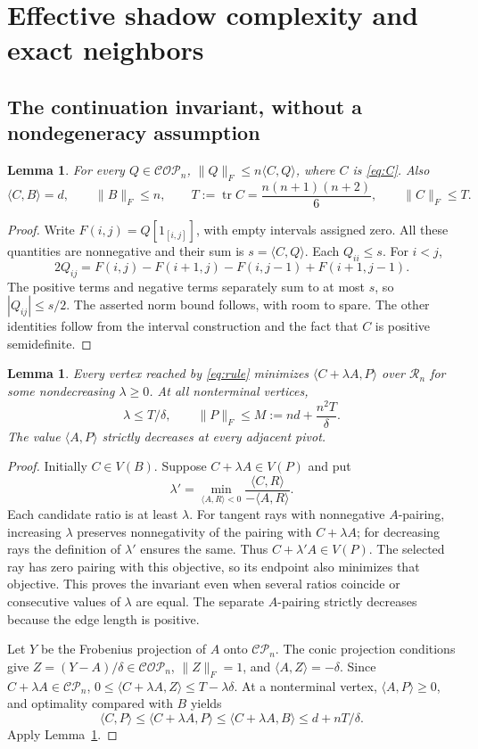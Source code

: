 \documentclass[11pt]{article}
\newtheorem{lemma}[theorem]{Lemma}
\theoremstyle{remark}\newtheorem{remark}[theorem]{Remark}
\newcommand{\CP}{\mathcal{CP}}
\newcommand{\COP}{\mathcal{COP}}
\newcommand{\Ry}{\mathcal R}
\newcommand{\tr}{\operatorname{tr}}
\newcommand{\ip}[2]{\langle #1,#2\rangle}
\newcommand{\norm}[1]{\lVert#1\rVert}
\begin{document}
\section{Effective shadow complexity and exact neighbors}\label{sec:shadow}
\subsection{The continuation invariant, without a nondegeneracy assumption}
\begin{lemma}\label{lem:anchor}
For every $Q\in\COP_n$, $\norm Q_F\le n\ip CQ$, where $C$ is \eqref{eq:C}. Also
\[
 \ip CB=d,\qquad \norm B_F\le n,\qquad
 T:=\tr C=\frac{n(n+1)(n+2)}6,\qquad \norm C_F\le T.
\]
\end{lemma}
\begin{proof}
Write $F(i,j)=Q[1_{[i,j]}]$, with empty intervals assigned zero. All these quantities are nonnegative and their sum is $s=\ip CQ$. Each $Q_{ii}\le s$. For $i<j$,
\[
 2Q_{ij}=F(i,j)-F(i+1,j)-F(i,j-1)+F(i+1,j-1).
\]
The positive terms and negative terms separately sum to at most $s$, so $|Q_{ij}|\le s/2$. The asserted norm bound follows, with room to spare. The other identities follow from the interval construction and the fact that $C$ is positive semidefinite.
\end{proof}

\begin{lemma}\label{lem:shadow}
Every vertex reached by \eqref{eq:rule} minimizes $\ip{C+\lambda A}{P}$ over $\Ry_n$ for some nondecreasing $\lambda\ge0$. At all nonterminal vertices,
\begin{equation}\label{eq:M}
 \lambda\le T/\delta,
 \qquad \norm P_F\le M:=nd+\frac{n^2T}{\delta}.
\end{equation}
The value $\ip AP$ strictly decreases at every adjacent pivot.
\end{lemma}
\begin{proof}
Initially $C\in V(B)$. Suppose $C+\lambda A\in V(P)$ and put
\[
 \lambda'=\min_{\ip AR<0}\frac{\ip CR}{-\ip AR}.
\]
Each candidate ratio is at least $\lambda$. For tangent rays with nonnegative $A$-pairing, increasing $\lambda$ preserves nonnegativity of the pairing with $C+\lambda A$; for decreasing rays the definition of $\lambda'$ ensures the same. Thus $C+\lambda'A\in V(P)$. The selected ray has zero pairing with this objective, so its endpoint also minimizes that objective. This proves the invariant even when several ratios coincide or consecutive values of $\lambda$ are equal. The separate $A$-pairing strictly decreases because the edge length is positive.

Let $Y$ be the Frobenius projection of $A$ onto $\CP_n$. The conic projection conditions give $Z=(Y-A)/\delta\in\COP_n$, $\norm Z_F=1$, and $\ip AZ=-\delta$. Since $C+\lambda A\in\CP_n$,
$0\le\ip{C+\lambda A}{Z}\le T-\lambda\delta$. At a nonterminal vertex, $\ip AP\ge0$, and optimality compared with $B$ yields
\[
 \ip CP\le\ip{C+\lambda A}{P}
 \le\ip{C+\lambda A}{B}\le d+nT/\delta.
\]
Apply Lemma~\ref{lem:anchor}.
\end{proof}
\end{document}
